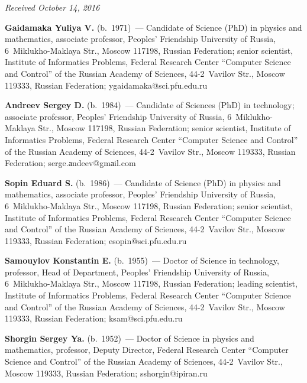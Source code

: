 \vspace*{-3pt}

\hfill{\small\textit{Received October 14, 2016}}

\Contr

\noindent
\textbf{Gaidamaka Yuliya V.} (b.\ 1971)~--- Candidate of Science (PhD) in physics and mathematics, 
associate professor, Peoples' Friendship University of Russia, 6~Miklukho-Maklaya Str., Moscow 117198, 
Russian Federation; senior scientist, Institute of Informatics Problems, Federal Research Center 
``Computer Science and Control'' of the Russian Academy of Sciences, 44-2~Vavilov Str., Moscow 
119333, Russian Federation; \mbox{ygaidamaka@sci.pfu.edu.ru}

\vspace*{3pt}

\noindent
\textbf{Andreev Sergey D.} (b.\ 1984)~--- Candidate of Sciences (PhD) in technology; associate 
professor, Peoples' Friendship University of Russia, 6~Miklukho-Maklaya Str., Moscow 117198, 
Russian Federation; senior scientist, Institute of Informatics Problems, Federal Research Center 
``Computer Science and Control'' of the Russian Academy of Sciences, 44-2~Vavilov Str., Moscow 
119333, Russian Federation; \mbox{serge.аndeev@gmаil.com}

\vspace*{3pt}

\noindent
\textbf{Sopin Eduard S.} (b.\ 1986)~--- Candidate of Science (PhD) in physics and mathematics, 
associate professor,  Peoples' Friendship University of Russia, 6~Miklukho-Maklaya Str., Moscow 
117198, 
Russian Federation; senior scientist, Institute of Informatics Problems, Federal Research Center 
``Computer Science and Control'' of the Russian Academy of Sciences, 44-2~Vavilov Str., Moscow 
119333, Russian Federation; \mbox{esopin@sci.pfu.edu.ru}

\vspace*{3pt}

\noindent
\textbf{Samouylov Konstantin E.} (b.\ 1955)~--- Doctor of Science in technology, professor, Head of 
Department, Peoples' Friendship University of Russia, 6~Miklukho-Maklaya Str., Moscow 117198, 
Russian Federation; leading scientist, Institute of Informatics Problems, Federal Research Center 
``Computer Science and Control'' of the Russian Academy of Sciences, 44-2~Vavilov Str., Moscow 
119333, Russian Federation; \mbox{ksam@sci.pfu.edu.ru}

\vspace*{3pt}

\noindent
\textbf{Shorgin Sergey Ya.} (b.\ 1952)~--- Doctor of Science in physics and mathematics, professor, 
Deputy Director, Federal Research Center ``Computer Science and Control'' of the Russian Academy of 
Sciences, 44-2~Vavilov Str., Moscow 119333, Russian Federation; \mbox{sshorgin@ipiran.ru}
\label{end\stat}


\renewcommand{\bibname}{\protect\rm Литература} 